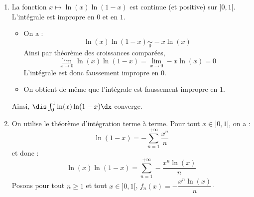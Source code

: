 \documentclass[a4paper,10pt]{report}
\begin{document}
\begin{corr}
\begin{enumerate}
\item La fonction $x \mapsto \ln(x) \ln(1-x)$ est continue (et positive) sur $]0,1[$. L'intégrale est impropre en $0$ et en $1$.
\begin{itemize}
\item On a :
$$  \ln(x) \ln(1-x) \underset{0}{\sim} -x \ln(x)$$
Ainsi par théorème des croissances comparées,
$$ \lim_{x \rightarrow 0 }   \ln(x) \ln(1-x) =  \lim_{x \rightarrow 0 }  -x \ln(x) = 0$$
L'intégrale est donc faussement impropre en $0$.
\item On obtient de même que l'intégrale est faussement impropre en $1$.
\end{itemize}
Ainsi, $\dis \int_{0}^1 \ln(x) \ln(1-x) \dx$ converge.

%
%

\item On utilise le théorème d'intégration terme à terme. Pour tout $x \in ]0,1[$, on a :
$$ \ln(1-x) = - \sum_{n=1}^{+ \infty} \dfrac{x^n}{n}$$
et donc :
$$ \ln(x)\ln(1-x) = \sum_{n=1}^{+ \infty} - \dfrac{x^n \ln(x)}{n}$$
Posons pour tout $n \geq 1$ et tout $x \in ]0,1[$, $f_n(x)=  - \dfrac{x^n \ln(x)}{n} \cdot$


\end{enumerate}
\end{corr}
\end{document}
